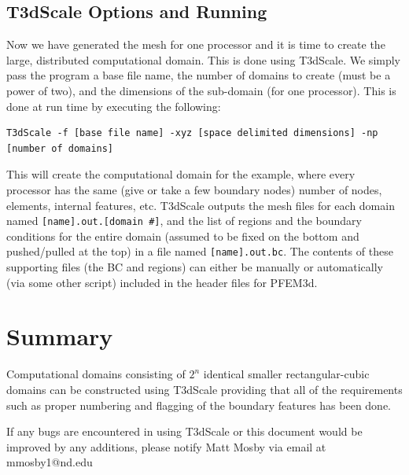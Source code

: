 \documentclass{article}
\begin{document}
\subsection{T3dScale Options and Running}
Now we have generated the mesh for one processor and it is time to
create the large, distributed computational domain.  This is done
using T3dScale.  We simply pass the program a base file name, the
number of domains to create (must be a power of two), and the
dimensions of the sub-domain (for one processor).  This is done at
run time by executing the following:
\begin{verbatim}
T3dScale -f [base file name] -xyz [space delimited dimensions] -np [number of domains]
\end{verbatim}
This will create the computational domain for the example, where every
processor has the same (give or take a few boundary nodes) number of
nodes, elements, internal features, etc.  T3dScale outputs the mesh
files for each domain named \verb|[name].out.[domain #]|, and the list
of regions and the boundary conditions for the entire domain (assumed
to be fixed on the bottom and pushed/pulled at the top) in a file
named \verb|[name].out.bc|.  The contents of these supporting files
(the BC and regions) can either be manually or automatically (via some
other script) included in the header files for PFEM3d.

\section{Summary}
Computational domains consisting of $2^n$ identical smaller
rectangular-cubic domains can be constructed using T3dScale providing
that all of the requirements such as proper numbering and flagging of
the boundary features has been done.

If any bugs are encountered in using T3dScale or this document would
be improved by any additions, please notify Matt Mosby via email at mmosby1@nd.edu
\end{document}
